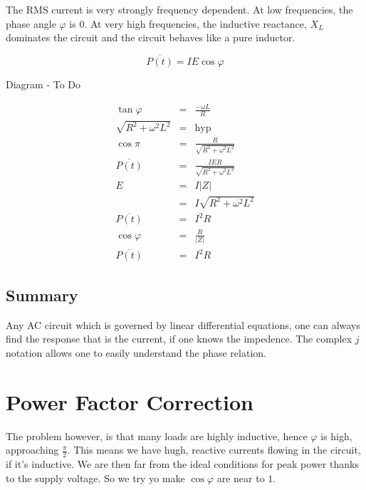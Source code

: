 \documentclass[a4paper,12pt]{article}
\begin{document}
The RMS current is very strongly frequency dependent. At low
frequencies, the phase angle $\varphi$ is $0$. At very high frequencies,
the inductive reactance, $X_{L}$ dominates the circuit and the circuit
behaves like a pure inductor.

\[ \overline{P(t)} = I E \cos{\varphi} \]

\begin{table}[hbtp]

Diagram - To Do

\end{table}

\begin{eqnarray*}
\tan{\varphi} & = & \frac{- \omega L}{R} \\
\sqrt{R^{2} + \omega^{2} L^{2}} & = & \mbox{hyp} \\
\cos{\pi} & = & \frac{R}{\sqrt{R^{2} + \omega^{2} L^{2}}} \\
\overline{P(t)} & = & \frac{IE R}{\sqrt{R^{2} + \omega^{2} L^{2}}} \\
E & = & I \left| Z \right| \\
  & = & I \sqrt{R^{2} + \omega^{2} L^{2}} \\
\overline{P(t)} & = & I^{2} R \\
\cos{\varphi} & = & \frac{R}{\left| Z \right|} \\
\overline{P(t)} & = & I^{2} R
\end{eqnarray*}

\subsection{Summary}

Any AC circuit which is governed by linear differential equations, one
can always find the response that is the current, if one knows the
impedence. The complex $j$ notation allows one to easily understand the
phase relation.

\section{Power Factor Correction}

The problem however, is that many loads are highly inductive, hence
$\varphi$ is high, approaching $\frac{\pi}{2}$. This means we have hugh,
reactive currents flowing in the circuit, if it's inductive. We are then
far from the ideal conditions for peak power thanks to the supply
voltage. So we try yo make $\cos{\varphi}$ are near to $1$.
\end{document}
